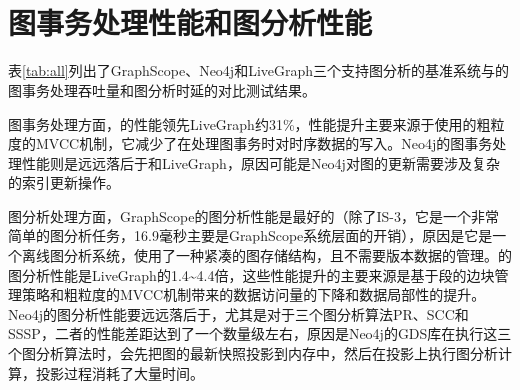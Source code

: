 \begin{figure}[!hpt]
\begin{minipage}{.45\linewidth}
\end{minipage} \\[10pt]
\begin{minipage}{1\linewidth}
\label{write}
\end{minipage} \\[-10pt]
\end{figure}

\section{图事务处理性能和图分析性能}
表\ref{tab:all}列出了GraphScope、Neo4j和LiveGraph三个支持图分析的基准系统与\sys 的图事务处理吞吐量和图分析时延的对比测试结果。

图事务处理方面，\sys 的性能领先LiveGraph约31\%，性能提升主要来源于\sys 使用的粗粒度的MVCC机制，它减少了\sys 在处理图事务时对时序数据的写入。Neo4j的图事务处理性能则是远远落后于\sys 和LiveGraph，原因可能是Neo4j对图的更新需要涉及复杂的索引更新操作。

图分析处理方面，GraphScope的图分析性能是最好的（除了IS-3，它是一个非常简单的图分析任务，16.9毫秒主要是GraphScope系统层面的开销），原因是它是一个离线图分析系统，使用了一种紧凑的图存储结构，且不需要版本数据的管理。\sys 的图分析性能是LiveGraph的1.4\textasciitilde 4.4倍，这些性能提升的主要来源是\newstore 基于段的边块管理策略和粗粒度的MVCC机制带来的数据访问量的下降和数据局部性的提升。Neo4j的图分析性能要远远落后于\sys，尤其是对于三个图分析算法PR、SCC和SSSP，二者的性能差距达到了一个数量级左右，原因是Neo4j的GDS库在执行这三个图分析算法时，会先把图的最新快照投影到内存中，然后在投影上执行图分析计算，投影过程消耗了大量时间。

